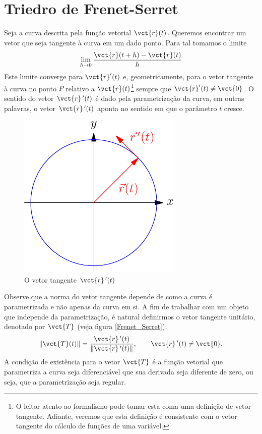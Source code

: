 \section{Triedro de Frenet-Serret}

Seja a curva descrita pela função vetorial $\vct{r}(t)$. Queremos encontrar um vetor que seja tangente à curva em um dado ponto. Para tal tomamos o limite
$$\lim_{h\to 0} \frac{\vct{r}(t+h)-\vct{r}(t)}{h}$$  
Este limite converge para $\vct{r}'(t)$ e, geometricamente, para o vetor tangente à curva no ponto $P$ relativo a $\vct{r}(t)$\footnote{O leitor atento ao formalismo pode tomar esta coma uma definição de vetor tangente. Adiante, veremos que esta definição é consistente com o vetor tangente do cálculo de funções de uma variável.} sempre que $\vct{r}'(t)\neq \vct{0}$. O sentido do vetor $\vct{r}~\!'(t)$ é dado pela parametrização da curva, em outras palavras, o vetor $\vct{r}~\!'(t)$ aponta no sentido em que o parâmetro $t$ cresce.


\begin{figure}%
\begin{center}
    \includegraphics{./cap_curvas/figs/vetor_tangente_circunferencia}
\caption{O vetor tangente $\vct{r}\!~'(t)$}\label{circtang}
  \end{center}
\end{figure}


Observe que a norma do vetor tangente depende de como a curva é parametrizada e não apenas da curva em si. A fim de trabalhar com um objeto que independe da parametrização, é natural definirmos o vetor tangente unitário, denotado por $\vct{T}$ (veja figura \ref{Frenet_Serret}):
\begin{equation}\label{defvecunit}
\|\vct{T}(t)\|=\frac{\vct{r}\!~'(t)}{\left\|\vct{r}\!~'(t)\right\|},\qquad \vct{r}\!~'(t)\neq \vct{0}.
\end{equation} 
A condição de existência para o vetor $\vct{T}$ é a função vetorial que parametriza a curva seja diferenciável que sua derivada seja diferente de zero, ou seja, que a parametrização seja regular.

